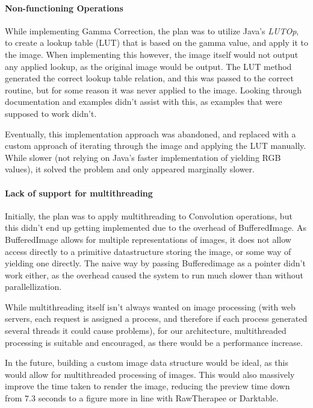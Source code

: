 \documentclass[10pt,a4paper]{article}
\begin{document}
\paragraph{Non-functioning Operations}
While implementing Gamma Correction, the plan was to utilize Java's \emph{LUTOp}, to create a lookup table (LUT) that is based on the gamma value,
and apply it to the image. When implementing this however, the image itself would not output any applied lookup, as the original image would be output.
The LUT method generated the correct lookup table relation, and this was passed to the correct routine, but for some reason it was never applied to the image. Looking through
documentation and examples didn't assist with this, as examples that were supposed to work didn't.

Eventually, this implementation approach was abandoned, and replaced with a custom approach of iterating through the image and applying the LUT
manually. While slower (not relying on Java's faster implementation of yielding RGB values), it solved the problem and only appeared marginally slower.

\paragraph{Lack of support for multithreading}
Initially, the plan was to apply multithreading to Convolution operations, but this didn't end up getting implemented due to the overhead of BufferedImage.
As BufferedImage allows for multiple representations of images, it does not allow access directly to a primitive datastructure storing the image, or some way of
yielding one directly. The naive way by passing Bufferedimage as a pointer didn't work either, as the overhead caused the system to run much slower than without parallellization.

While multithreading itself isn't always wanted on image processing (with web servers, each request is assigned a process, and therefore if each process generated several threads it could
cause problems), for our architecture, multithreaded processing is suitable and encouraged, as there would be a performance increase.

In the future, building a custom image data structure would be ideal, as this would allow for multithreaded processing of images. This would also massively improve the time taken to
render the image, reducing the preview time down from $7.3$ seconds to a figure more in line with RawTherapee or Darktable.
\end{document}

